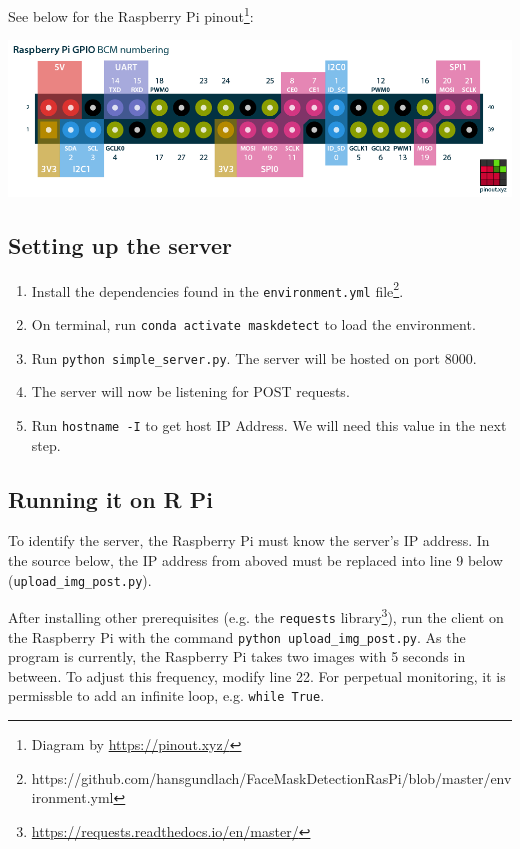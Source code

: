 \documentclass[conference, 12pt, onecolumn]{IEEEtran}
\begin{document}
See below for the Raspberry Pi pinout\footnote{Diagram by \url{https://pinout.xyz/}}:
\begin{center}
\includegraphics[scale=.5]{raspberry-pi-pinout}
\end{center}

\subsection{Setting up the server}
\begin{enumerate}
\item Install the dependencies found in the \texttt{environment.yml} file\footnote{https://github.com/hansgundlach/FaceMaskDetectionRasPi/blob/master/environment.yml}.
\item On terminal, run \texttt{conda activate maskdetect} to load the environment.
\item Run \texttt{python simple\_server.py}. The server will be hosted on port 8000.
\item The server will now be listening for POST requests.
\item Run \texttt{hostname -I} to get host IP Address. We will need this value in the next step.
\end{enumerate}

\subsection{Running it on R Pi}
To identify the server, the Raspberry Pi must know the server's IP address. In the source  below, the IP address from aboved must be replaced into line 9 below (\texttt{upload\_img\_post.py}).

After installing other prerequisites (e.g. the \texttt{requests} library\footnote{\url{https://requests.readthedocs.io/en/master/}}), run the client on the Raspberry Pi with the command \texttt{python upload\_img\_post.py}. As the program is currently, the Raspberry Pi takes two images with 5 seconds in between. To adjust this frequency, modify line 22. For perpetual monitoring, it is permissble to add an infinite loop, e.g. \texttt{while True}.
\end{document}

